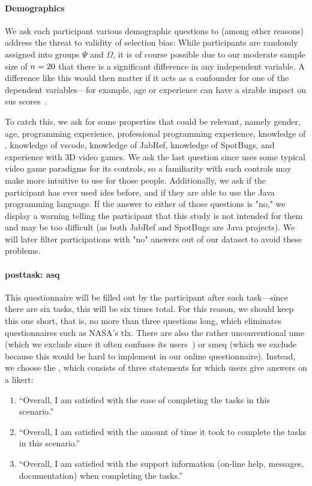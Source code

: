 \documentclass[../thesis]{subfiles}
\begin{document}
\paragraph{Demographics}
We ask each participant various demographic questions to (among other reasons) address the threat to validity of selection bias:
While participants are randomly assigned into groups $\Psi$ and $\Omega$, it is of course possible due to our moderate sample size of $n = 20$ that there is a significant difference in any independent variable.
A difference like this would then matter if it acts as a confounder for one of the dependent variables---for example, age or experience can have a sizable impact on \gls{sus} scores~\cites[585]{bangor2008}{mclellan2012}.

To catch this, we ask for some properties that could be relevant, namely
gender, age, programming experience, professional programming experience, knowledge of \SEE{}, knowledge of \gls{vscode}, knowledge of JabRef, knowledge of SpotBugs, and experience with 3D video games.
We ask the last question since \SEE{} uses some typical video game paradigms for its controls, so a familiarity with such controls may make \SEE{} more intuitive to use for those people.
Additionally, we ask if the participant has ever used \glspl{ide} before, and if they are able to use the Java programming language.
If the answer to either of those questions is "no," we display a warning telling the participant that this study is not intended for them and may be too difficult (as both JabRef and SpotBugs are Java projects).
We will later filter participations with "no" answers out of our dataset to avoid these problems.

\paragraph{\Gls{posttask}: \gls{asq}}
This questionnaire will be filled out by the participant after each task---since there are six tasks, this will be six times total.
For this reason, we should keep this one short, that is, no more than three questions long, which eliminates questionnaires such as NASA's \gls{tlx}.
There are also the rather unconventional \gls{ume} (which we exclude since it often confuses its users~\cite[1607--1608]{sauro2009b}) or \gls{smeq} (which we exclude because this would be hard to implement in our online questionnaire).
Instead, we choose the \emph{}, which consists of three statements for which users give answers on a \gls{likert}:
\begin{enumerate}
	\item \enquote{Overall, I am satisfied with the ease of completing the tasks in this scenario.}
	\item \enquote{Overall, I am satisfied with the amount of time it took to complete the tasks in this scenario.}
	\item \enquote{Overall, I am satisfied with the support information (on-line help, messages, documentation) when completing the tasks.}
\end{enumerate}
\end{document}
